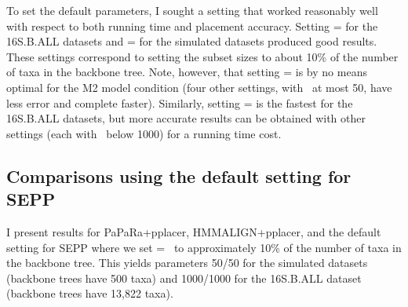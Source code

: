 To set the default parameters, I sought a setting that
worked reasonably well with respect to both
running time and placement accuracy. 
Setting \ssa= for the 16S.B.ALL
datasets and \ssa= for the
simulated datasets  produced good results.  These
settings correspond to setting the subset sizes to about
10\% of the number of taxa in the
backbone tree.
Note, however, that setting \ssa= is by no means optimal for the M2
model condition (four other settings, with \ssa~at most 50,
have less error and complete faster).
Similarly, setting \ssa= is the fastest for the
16S.B.ALL datasets, but more accurate
results can be obtained with other settings (each
with \ssa~below 1000)
for a running time cost.

\vspace{.1in}
\subsection{Comparisons using the default setting for SEPP}

I present results for PaPaRa+pplacer, HMMALIGN+pplacer, and
the default setting for SEPP where we set
\ssa= \ssp~to approximately 
10\% of the number of taxa in the backbone tree. This yields
parameters 50/50 for the simulated datasets (backbone trees have 500
taxa) and 1000/1000 for the 16S.B.ALL dataset (backbone
trees have 13,822 taxa).

